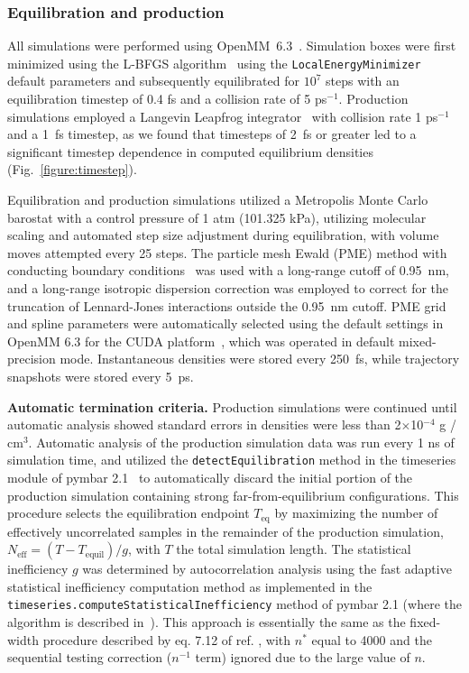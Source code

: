 \documentclass[aip, jcp, reprint]{revtex4-1}  %
\begin{document}
\subsubsection{Equilibration and production}
\label{section:production}

All simulations were performed using OpenMM~6.3~\cite{eastman2012openmm}.
Simulation boxes were first minimized using the L-BFGS algorithm~\cite{liu1989limited} using the {\tt LocalEnergyMinimizer} default parameters and subsequently equilibrated for $10^7$ steps with an equilibration timestep of 0.4 fs and a collision rate of 5 ps$^{-1}$.  
Production simulations employed a Langevin Leapfrog integrator~\cite{izaguirre-sweet-pande:psb:2010:langevin-leapfrog} with collision rate 1 ps$^{-1}$ and a 1~fs timestep, as we found that timesteps of 2~fs or greater led to a significant timestep dependence in computed equilibrium densities (Fig.~\ref{figure:timestep}).  

Equilibration and production simulations utilized a Metropolis Monte Carlo barostat with a control pressure of 1 atm (101.325 kPa), utilizing molecular scaling and automated step size adjustment during equilibration, with volume moves attempted every 25 steps.  
The particle mesh Ewald (PME) method with conducting boundary conditions~\cite{Darden1993} was used with a long-range cutoff of 0.95~nm, and a long-range isotropic dispersion correction was employed to correct for the truncation of Lennard-Jones interactions outside the 0.95~nm cutoff.
PME grid and spline parameters were automatically selected using the default settings in OpenMM 6.3 for the CUDA platform~\cite{eastman2012openmm}, which was operated in default mixed-precision mode.
Instantaneous densities were stored every 250~fs, while trajectory snapshots were stored every 5~ps.  

{\bf Automatic termination criteria.}
Production simulations were continued until automatic analysis showed standard errors in densities were less than 2$\times$10$^{-4}$ g / cm$^{3}$.
Automatic analysis of the production simulation data was run every 1 ns of simulation time, and utilized the {\tt detectEquilibration} method in the timeseries module of pymbar 2.1~\cite{shirts2008statistically} to automatically discard the initial portion of the production simulation containing strong far-from-equilibrium configurations.
This procedure selects the equilibration endpoint $T_\mathrm{eq}$ by maximizing the number of effectively uncorrelated samples in the remainder of the production simulation, $N_\mathrm{eff} = (T - T_\mathrm{equil}) / g$, with $T$ the total simulation length.
The statistical inefficiency $g$ was determined by autocorrelation analysis using the fast adaptive statistical inefficiency computation method as implemented in the {\tt timeseries.computeStatisticalInefficiency} method of pymbar 2.1 (where the algorithm is described in~\cite{chodera2007}).
This approach is essentially the same as the fixed-width procedure described by eq. 7.12 of ref. \cite{brooks2011handbook}, with $n^*$ equal to 4000 and the sequential testing correction ($n^{-1}$ term) ignored due to the large value of $n$.
\end{document}
